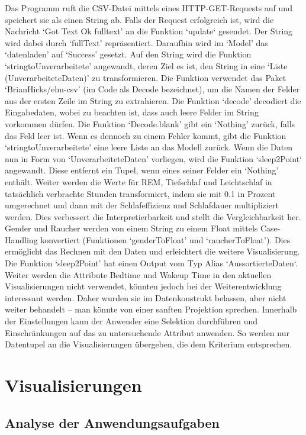 \documentclass[usegeometry=true]{scrartcl}
\begin{document}
 Das Programm ruft die CSV-Datei mittels eines HTTP-GET-Requests auf und speichert sie als einen String ab. Falls der Request erfolgreich ist, wird die Nachricht `Got Text Ok fulltext' an die Funktion `update` gesendet. Der String wird dabei durch `fullText' repräsentiert. Daraufhin wird im `Model' das `datenladen' auf `Success' gesetzt.
 Auf den String wird die Funktion `stringtoUnverarbeitete' angewandt, deren Ziel es ist, den String in eine `Liste (UnverarbeiteteDaten)' zu transformieren. Die Funktion verwendet das Paket `BrianHicks/elm-csv' (im Code als Decode bezeichnet), um die Namen der Felder aus der ersten Zeile im String zu extrahieren. Die Funktion `decode' decodiert die Eingabedaten, wobei zu beachten ist, dass auch leere Felder im String vorkommen dürfen. Die Funktion `Decode.blank' gibt ein `Nothing' zurück, falls das Feld leer ist. Wenn es dennoch zu einem Fehler kommt, gibt die Funktion `stringtoUnverarbeitete' eine leere Liste an das Modell zurück.
 Wenn die Daten nun in Form von `UnverarbeiteteDaten' vorliegen, wird die Funktion `sleep2Point` angewandt. Diese entfernt ein Tupel, wenn eines seiner Felder ein `Nothing' enthält. Weiter werden die Werte für REM, Tiefschlaf und Leichtschlaf in tatsächlich verbrachte Stunden transformiert, indem sie mit 0.1 in Prozent umgerechnet und dann mit der Schlafeffizienz und Schlafdauer multipliziert werden. Dies verbessert die Interpretierbarkeit und stellt die Vergleichbarkeit her.
 Gender und Raucher werden von einem String zu einem Float mittels Case-Handling konvertiert (Funktionen `genderToFloat' und `raucherToFloat'). Dies ermöglicht das Rechnen mit den Daten und erleichtert die weitere Visualisierung.
 Die Funktion `sleep2Point' hat einen Output vom Typ Alias `AussortierteDaten`. Weiter werden die Attribute Bedtime und Wakeup Time in den aktuellen Visualisierungen nicht verwendet, könnten jedoch bei der Weiterentwicklung interessant werden. Daher wurden sie im Datenkonstrukt belassen, aber nicht weiter behandelt – man könnte von einer sanften Projektion sprechen. Innerhalb der Einstellungen kann der Anwender eine Selektion durchführen und Einschränkungen auf das zu untersuchende Attribut anwenden. So werden nur Datentupel an die Visualisierungen übergeben, die dem Kriterium entsprechen.


   
\newpage
\section{Visualisierungen}
\subsection{Analyse der Anwendungsaufgaben}
\end{document}
